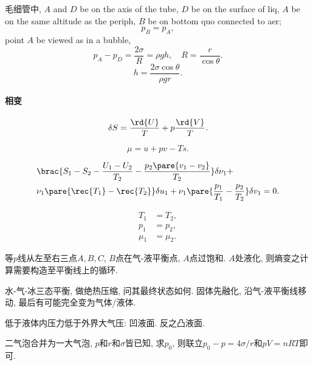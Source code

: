 \documentclass{ctexart}
\begin{document}
\headerstamp

\begin{ex}[毛细现象]
毛细管中, $A$ and $D$ be on the axis of the tube, $D$ be on the surface of liq, $A$ be on the same altitude as the periph, $B$ be on bottom quo connected to aer;
\[ p_B = p_A, \]
point $A$ be viewed as in a bubble,
\[ p_A - p_D = \frac{2\sigma}{R} = \rho gh,\quad R = \frac{r}{\cos\theta}. \]
\[ h = \frac{2\sigma\cos\theta}{\rho gr}. \]
\end{ex}

\paragraph{相变} %
\label{par:相变}

\[ \delta S = \frac{\rd{U}}{T} + p\frac{\rd{V}}{T}. \]
\begin{finale}
	\[ \mu = u+pv-Ts. \]
\end{finale}
\begin{align*}
&\brac{S_1 - S_2 - \frac{U_1 - U_2}{T_2} - \frac{p_2\pare{v_1-v_2}}{T_2}}\delta \nu_1 +\\& \nu_1\pare{\rec{T_1} - \rec{T_2}}\delta u_1 + \nu_1\pare{\frac{p_1}{T_1}-\frac{p_2}{T_2}}\delta v_1 = 0.
\end{align*}

\begin{align*}
	T_1 &= T_2,\\
	p_1 &= p_2,\\
	\mu_1 &= \mu_2.
\end{align*}


\begin{ex}
	等$p$线从左至右三点$A,B,C$, $B$点在气-液平衡点, $A$点过饱和. $A$处液化, 则熵变之计算需要构造至平衡线上的循环.
\end{ex}
\begin{ex}
	水-气-冰三态平衡, 做绝热压缩, 问其最终状态如何. 固体先融化, 沿气-液平衡线移动, 最后有可能完全变为气体/液体.
\end{ex}
\begin{ex}
	低于液体内压力低于外界大气压: 凹液面. 反之凸液面.
\end{ex}
\begin{ex}
	二气泡合并为一大气泡, $p$和$r$和$\sigma$皆已知, 求$p_0$, 则联立$p_0-p=4\sigma/r$和$pV=nRT$即可.
\end{ex}
\end{document}
